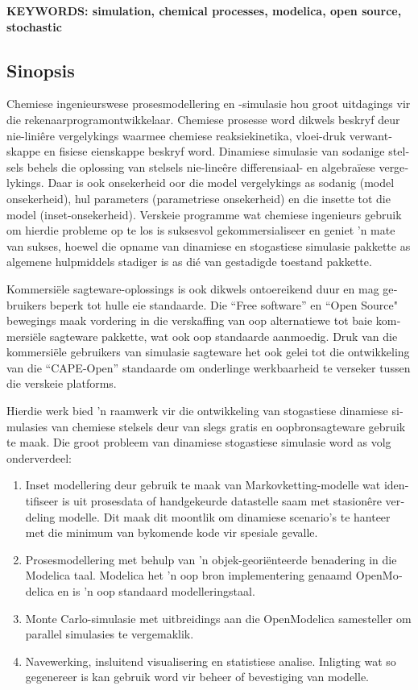 \noindent \textbf{KEYWORDS: simulation, chemical processes, modelica, open source, stochastic} 

\begin{otherlanguage}{afrikaans}
\chapter*{Sinopsis}
Chemiese ingenieurswese prosesmodellering en -simulasie hou groot uitdagings vir die rekenaarprogramontwikkelaar. 
Chemiese prosesse word dikwels beskryf deur nie-lini\^ere vergelykings waarmee chemiese reaksiekinetika, vloei-druk verwantskappe en fisiese eienskappe beskryf word. 
Dinamiese simulasie van sodanige stelsels behels die oplossing van stelsels nie-line\^ere differensiaal- en algebra\"iese vergelykings. 
Daar is ook onsekerheid oor die model vergelykings as sodanig (model onsekerheid), hul parameters (parametriese onsekerheid) en die insette tot die model (inset-onsekerheid). 
Verskeie programme wat chemiese ingenieurs gebruik om hierdie probleme op te los is suksesvol gekommersialiseer en geniet 'n mate van sukses, hoewel die opname van dinamiese en stogastiese simulasie pakkette as algemene hulpmiddels stadiger is as di\'e van gestadigde toestand pakkette.

Kommersi\"ele sagteware-oplossings is ook dikwels ontoereikend duur en mag gebruikers beperk tot hulle eie standaarde. 
Die ``Free software'' en ``Open Source" bewegings maak vordering in die verskaffing van oop alternatiewe tot baie kommersi\"ele sagteware pakkette, wat ook oop standaarde aanmoedig.
Druk van die kommersi\"ele gebruikers van simulasie sagteware het ook gelei tot die ontwikkeling van die ``CAPE-Open'' standaarde om onderlinge werkbaarheid te verseker tussen die verskeie platforms. 

Hierdie werk bied 'n raamwerk vir die ontwikkeling van stogastiese dinamiese simulasies van chemiese stelsels deur van slegs gratis en oopbronsagteware gebruik te maak. 
Die groot probleem van dinamiese stogastiese simulasie word as volg onderverdeel:
\begin{enumerate}
\item Inset modellering deur gebruik te maak van Markovketting-modelle wat identifiseer is uit prosesdata of handgekeurde datastelle saam met stasion\^ere verdeling modelle.
  Dit maak dit moontlik om dinamiese scenario's te hanteer met die minimum van bykomende kode vir spesiale gevalle.
\item Prosesmodellering met behulp van 'n objek-geori\"enteerde benadering in die Modelica taal.
  Modelica het 'n oop bron implementering genaamd OpenModelica en is 'n oop standaard modelleringstaal.
\item Monte Carlo-simulasie met uitbreidings aan die OpenModelica samesteller om parallel simulasies te vergemaklik.
\item Navewerking, insluitend visualisering en statistiese analise.
  Inligting wat so gegenereer is kan gebruik word vir beheer of bevestiging van modelle.
\end{enumerate}


\end{otherlanguage}
